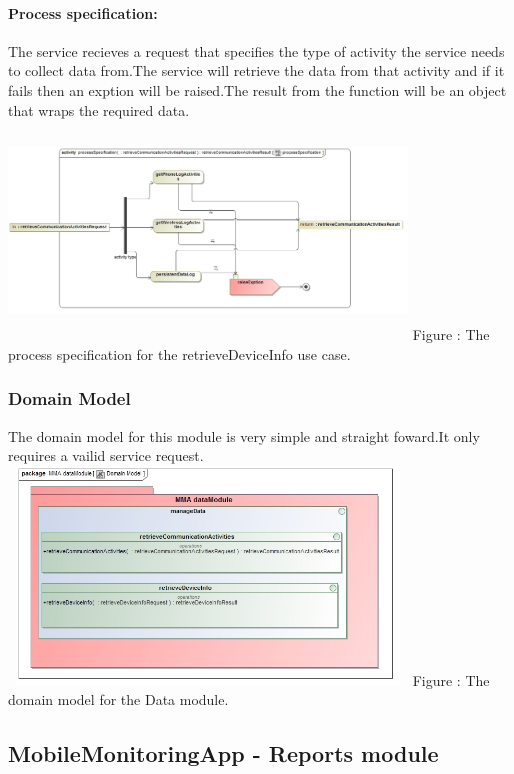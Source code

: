 \documentclass[hidelinks, 12pt, oneside]{article}
\begin{document}
			\paragraph{Process specification:}
			The  service recieves a request that specifies the type of activity the service needs to collect data from.The service will retrieve the data from that activity and if it fails then an exption will be raised.The result from the function will be an object that wraps the required data.\newline
			\includegraphics[width=400px,height=220px]{img/processSpecificationRetrieveCommunicationActivities.jpg}
			Figure : The process specification for the retrieveDeviceInfo use case.
			
	
		\subsubsection{Domain Model}
		The domain model for this module is very simple and straight foward.It only requires a vailid service request.\newline
		\includegraphics[width=400px,height=220px]{img/DomainModelDataModule.jpg}
		Figure : The domain model for the Data module.
		
	\subsection{MobileMonitoringApp - Reports module}
\end{document}
